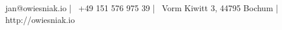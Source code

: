 \documentclass[]{awesome-cv}
\begin{document}
 \begin{center}
	\vspace{\fill}
	{\faEnvelope\ jan@owiesniak.io} | {\faMobile\ +49 151 576 975 39} | {\faMapMarker\ Vorm Kiwitt 3, 44795 Bochum} | {\faLink\ http://owiesniak.io}
\end{center}
\ 
\end{document}
